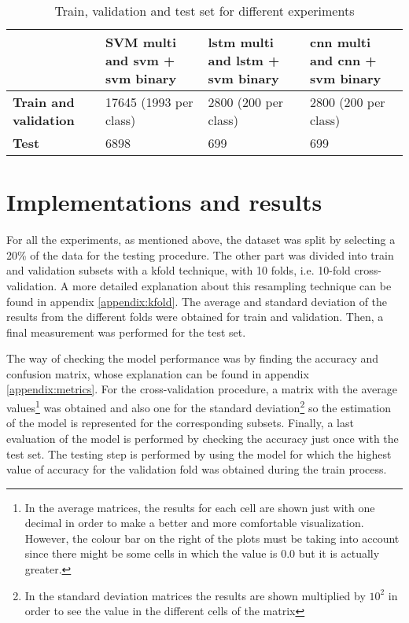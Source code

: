 	
	\begin{table}[ht]
		\centering
		\begin{tabular}{|| m{5em} | m{9em} | m{9em} | m{9em} ||}
			\hline
			& \textbf{SVM multi and \acrshort{svm} + \acrshort{svm} binary} & \textbf{\acrshort{lstm} multi and \acrshort{lstm} + \acrshort{svm} binary} & \textbf{\acrshort{cnn} multi and \acrshort{cnn} + \acrshort{svm} binary}  \\
			\hline\hline
			\textbf{Train and validation} & 17645 (1993 per class) & 2800 (200 per class) & 2800 (200 per class) \\
			\hline
			\textbf{Test} & 6898 & 699 & 699 \\
			\hline                    
		\end{tabular}
		\caption{Train, validation and test set for different experiments}
		\label{table:8}
	\end{table}

\section{Implementations and results}

	For all the experiments, as mentioned above, the dataset was split by selecting a 20\% of the data for the testing procedure. The other part was divided into train and validation subsets with a \acrlong{kfold} technique, with 10 folds, i.e. 10-fold cross-validation. A more detailed explanation about this resampling technique can be found in appendix \ref{appendix:kfold}. The average and standard deviation of the results from the different folds were obtained for train and validation. Then, a final measurement was performed for the test set. 
	
	The way of checking the model performance was by finding the accuracy and confusion matrix, whose explanation can be found in appendix \ref{appendix:metrics}. For the cross-validation procedure, a matrix with the average values\footnote{In the average matrices, the results for each cell are shown just with one decimal in order to make a better and more comfortable visualization. However, the colour bar on the right of the plots must be taking into account since there might be some cells in which the value is $0.0$ but it is actually greater.} was obtained and also one for the standard deviation\footnote{In the standard deviation matrices the results are shown multiplied by $10^{2}$ in order to see the value in the different cells of the matrix} so the estimation of the model is represented for the corresponding subsets. Finally, a last evaluation of the model is performed by checking the accuracy just once with the test set. The testing step is performed by using the model for which the highest value of accuracy for the validation fold was obtained during the train process.
	
